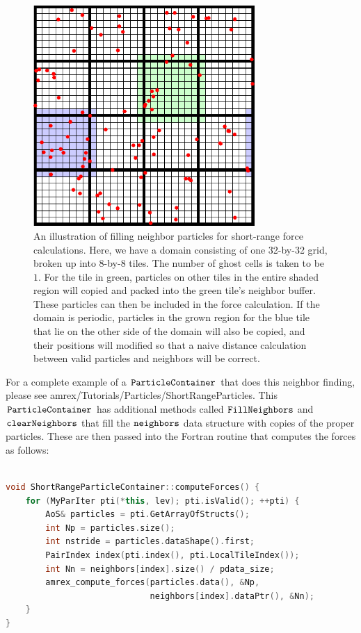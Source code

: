 \begin{figure}
  \centering
  \includegraphics[width=0.75\textwidth]{./Particle/neighbor_particles.pdf}
  \caption{\label{fig:particles:neighbor_particles} An illustration of filling neighbor particles for short-range force calculations. Here, we have a domain consisting of one 32-by-32 grid, broken up into 8-by-8 tiles. The number of ghost cells is taken to be $1$. For the tile in green, particles on other tiles in the entire shaded region will copied and packed into the green tile's neighbor buffer. These particles can then be included in the force calculation. If the domain is periodic, particles in the grown region for the blue tile that lie on the other side of the domain will also be copied, and their positions will modified so that a naive distance calculation between valid particles and neighbors will be correct.
}
\end{figure}

For a complete example of a $\tt{ParticleContainer}$ that does this neighbor finding, please see amrex/Tutorials/Particles/ShortRangeParticles. This $\tt{ParticleContainer}$ has additional methods called $\tt{FillNeighbors}$ and $\tt{clearNeighbors}$ that fill the $\tt{neighbors}$ data structure with copies of the proper particles. These are then passed into the Fortran routine that computes the forces as follows:

\begin{lstlisting}[language=cpp]

void ShortRangeParticleContainer::computeForces() {
    for (MyParIter pti(*this, lev); pti.isValid(); ++pti) {
        AoS& particles = pti.GetArrayOfStructs();
        int Np = particles.size();
        int nstride = particles.dataShape().first;
        PairIndex index(pti.index(), pti.LocalTileIndex());
        int Nn = neighbors[index].size() / pdata_size;
        amrex_compute_forces(particles.data(), &Np,
                             neighbors[index].dataPtr(), &Nn);
    }
}

\end{lstlisting}

